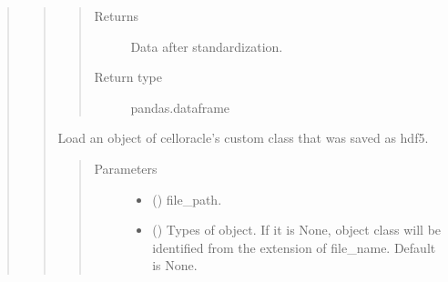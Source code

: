 \documentclass[letterpaper,10pt,english]{sphinxmanual}
\begin{document}
\begin{quote}
\begin{quote}
\begin{fulllineitems}
\begin{quote}
\begin{description}
\item[{Returns}] \leavevmode
Data after standardization.

\item[{Return type}] \leavevmode
pandas.dataframe

\end{description}\end{quote}

\end{fulllineitems}


\begin{fulllineitems}
\label{\detokenize{modules/celloracle.utility:celloracle.utility.load_hdf5}}
Load an object of celloracle’s custom class that was saved as hdf5.
\begin{quote}\begin{description}
\item[{Parameters}] \leavevmode\begin{itemize}
\item {} 
 () \textendash{} file\_path.

\item {} 
 () \textendash{} Types of object.
If it is None, object class will be identified from the extension of file\_name.
Default is None.

\end{itemize}

\end{description}\end{quote}

\end{fulllineitems}



\end{quote}
\end{quote}
\end{document}

